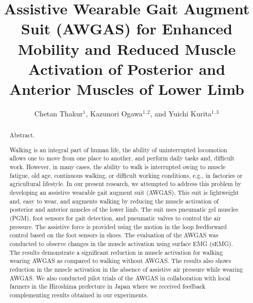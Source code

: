 \documentclass[paper,JRM,paper]{jaciiiarticle}
\begin{document}
\pagestyle{jaciiistyle}

\title{Assistive Wearable Gait Augment Suit (AWGAS) for Enhanced Mobility and Reduced Muscle Activation of Posterior and Anterior Muscles of Lower Limb}
\author{Chetan Thakur$^1$, Kazunori Ogawa$^1$$^,$$^2$, and Yuichi Kurita$^1$$^,$$^3$}
\address{$^1$Hiroshima University, Hiroshima, Japan\\
		 $^2$ Daiya Industries Co, Ltd. Okayama, Japan\\
		 $^3$ JST PRESTO, Saitama, Japan\\
         E-mail: chetanthakur@hiroshima-u.ac.jp}
\maketitle

\begin{abstract}%
\noindent Abstract. %

Walking is an integral part of human life, the ability of uninterrupted locomotion allows one to move from one place to another, and perform daily tasks and, difficult work. However, in many cases, the ability to walk is interrupted owing to muscle fatigue, old age, continuous walking, or difficult working conditions, e.g., in factories or agricultural lifestyle. In our present research, we attempted to address this problem by developing an assistive wearable gait augment suit (AWGAS). This suit is lightweight and, easy to wear, and augments walking by reducing the muscle activation of posterior and anterior muscles of the lower limb. The suit uses pneumatic gel muscles (PGM), foot sensors for gait detection, and pneumatic valves to control the air pressure. The assistive force is provided using the motion in the loop feedforward control based on the foot sensors in shoes. The evaluation of the AWGAS was conducted to observe changes in the muscle activation using surface EMG (sEMG). The results demonstrate a significant reduction in muscle activation for walking wearing AWGAS as compared to walking without AWGAS. The results also shows reduction in the muscle activation in the absence of assistive air pressure while wearing AWGAS. We also conducted pilot trials of the AWGAS in collaboration with local farmers in the Hiroshima prefecture in Japan where we received feedback complementing results obtained in our experiments.  
\end{abstract}
\end{document}

